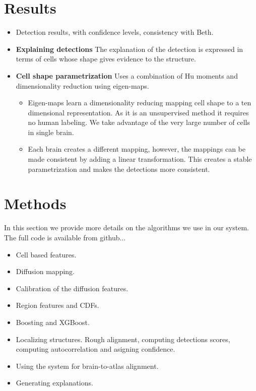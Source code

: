\documentclass[runningheads]{llncs}
\begin{document}
\begin{enumerate}
\section{Results}
\begin{itemize}
    \item Detection results, with confidence levels, consistency with Beth.
    \item {\bf Explaining detections} The explanation of the detection is expressed in terms of cells whose shape gives evidence to the structure.
\item {\bf Cell shape parametrization} Uses a combination of Hu moments and dimensionality reduction using eigen-maps.
\begin{itemize}
    \item Eigen-maps learn a dimensionality reducing mapping cell shape to a ten dimensional representation.
    As it is an unsupervised method it requires no human labeling. We take advantage of the very large number of cells in single brain.
    \item Each brain creates a different mapping, however, the mappings can be made consistent by adding a linear transformation. This creates a stable parametrization and makes the detections more consistent.
\end{itemize}

\end{itemize}

\section{Methods}
In this section we provide more details on the algorithms we use in
our system. The full code is available from github...

\begin{itemize}
\item Cell based features.
\item Diffusion mapping.
\item Calibration of the diffusion features.
\item Region features and CDFs.
\item Boosting and XGBoost.
\item Localizing structures. Rough alignment, computing detections
  scores, computing autocorrelation and asigning confidence.
\item Using the system for brain-to-atlas alignment.
\item Generating explanations.
\end{itemize}


\end{enumerate}
\end{document}
